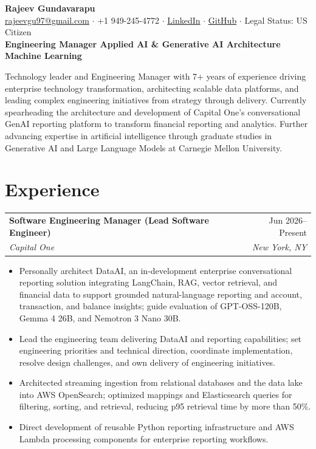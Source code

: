 \documentclass[11pt,a4paper]{article}
\makeatletter
\newcommand{\resumeentry}[4]{%
  \begin{tabularx}{\textwidth}{@{}Xr@{}}
    \textbf{#1} & \textcolor{muted}{#4} \\
    \textit{#2} & \textit{\textcolor{muted}{#3}}
  \end{tabularx}\par\vspace{-3pt}
}
\newenvironment{compactitemize}{%
  \begin{itemize}
  \setlength{\itemsep}{0pt}
  \setlength{\topsep}{1pt}
  \setlength{\parsep}{0pt}
}{\end{itemize}}
\makeatother
\begin{document}
\begin{center}
  {\LARGE\bfseries Rajeev Gundavarapu}\\[4pt]
  \small
  \href{mailto:rajeevgu97@gmail.com}{rajeevgu97@gmail.com}
  \enspace $\cdot$ \enspace +1 949-245-4772
  \enspace $\cdot$ \enspace \href{https://linkedin.com/in/rajeevanirudh}{LinkedIn}
  \enspace $\cdot$ \enspace \href{https://github.com/rajeev97}{GitHub}
  \enspace $\cdot$ \enspace Legal Status: US Citizen
  \\[3pt]
  {\large\bfseries Engineering Manager \textbar{} Applied AI \& Generative AI Architecture \textbar{} Machine Learning}
\end{center}
\vspace{-2pt}

\small
Technology leader and Engineering Manager with 7+ years of experience driving enterprise technology transformation, architecting scalable data platforms, and leading complex engineering initiatives from strategy through delivery. Currently spearheading the architecture and development of Capital One's conversational GenAI reporting platform to transform financial reporting and analytics. Further advancing expertise in artificial intelligence through graduate studies in Generative AI and Large Language Models at Carnegie Mellon University.
\normalsize

\section{Experience}

\resumeentry{Software Engineering Manager (Lead Software Engineer)}{Capital One}{New York, NY}{Jun 2026--Present}
\begin{compactitemize}
  \item Personally architect DataAI, an in-development enterprise conversational reporting solution integrating LangChain, RAG, vector retrieval, and financial data to support grounded natural-language reporting and account, transaction, and balance insights; guide evaluation of GPT-OSS-120B, Gemma 4 26B, and Nemotron 3 Nano 30B.
  \item Lead the engineering team delivering DataAI and reporting capabilities; set engineering priorities and technical direction, coordinate implementation, resolve design challenges, and own delivery of engineering initiatives.
  \item Architected streaming ingestion from relational databases and the data lake into AWS OpenSearch; optimized mappings and Elasticsearch queries for filtering, sorting, and retrieval, reducing p95 retrieval time by more than 50\%.
  \item Direct development of reusable Python reporting infrastructure and AWS Lambda processing components for enterprise reporting workflows.
\end{compactitemize}
\end{document}
